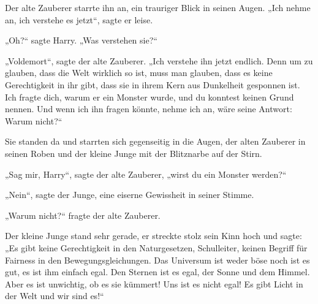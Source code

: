 Der alte Zauberer starrte ihn an, ein trauriger Blick in seinen Augen.
„Ich nehme an, ich verstehe es jetzt“, sagte er leise.

„Oh?“ sagte Harry.
„Was verstehen sie?“

„Voldemort“, sagte der alte Zauberer.
„Ich verstehe ihn jetzt endlich. Denn um zu glauben, dass die Welt wirklich so ist, muss man glauben, dass es keine Gerechtigkeit in ihr gibt, dass sie in ihrem Kern aus Dunkelheit gesponnen ist. Ich fragte dich, warum er ein Monster wurde, und du konntest keinen Grund nennen. Und wenn ich ihn fragen könnte, nehme ich an, wäre seine Antwort: Warum nicht?“

\later

Sie standen da und starrten sich gegenseitig in die Augen, der alten Zauberer in seinen Roben und der kleine Junge mit der Blitznarbe auf der Stirn.

„Sag mir, Harry“, sagte der alte Zauberer, „wirst du ein Monster werden?“

„Nein“, sagte der Junge, eine eiserne Gewissheit in seiner Stimme.

„Warum nicht?“ fragte der alte Zauberer.

Der kleine Junge stand sehr gerade, er streckte stolz sein Kinn hoch und sagte:
„Es gibt keine Gerechtigkeit in den Naturgesetzen, Schulleiter, keinen Begriff für Fairness in den Bewegungsgleichungen. Das Universum ist weder böse noch ist es gut, es ist ihm einfach egal. Den Sternen ist es egal, der Sonne und dem Himmel. Aber es ist unwichtig, ob es sie kümmert! Uns ist es nicht egal! Es gibt Licht in der Welt und wir sind es!“

